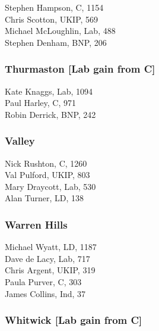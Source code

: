 \documentclass[a4paper,openany,10pt]{book}
\begin{document}


Stephen Hampson, C, 1154\\
Chris Scotton, UKIP, 569\\
Michael McLoughlin, Lab, 488\\
Stephen Denham, BNP, 206\\


\subsubsection*{Thurmaston \hspace*{\fill}\nolinebreak[1]%
\enspace\hspace*{\fill}
[Lab gain from C]}



Kate Knaggs, Lab, 1094\\
Paul Harley, C, 971\\
Robin Derrick, BNP, 242\\


\subsubsection*{Valley}



Nick Rushton, C, 1260\\
Val Pulford, UKIP, 803\\
Mary Draycott, Lab, 530\\
Alan Turner, LD, 138\\


\subsubsection*{Warren Hills}



Michael Wyatt, LD, 1187\\
Dave de Lacy, Lab, 717\\
Chris Argent, UKIP, 319\\
Paula Purver, C, 303\\
James Collins, Ind, 37\\


\subsubsection*{Whitwick \hspace*{\fill}\nolinebreak[1]%
\enspace\hspace*{\fill}
[Lab gain from C]}
\end{document}
